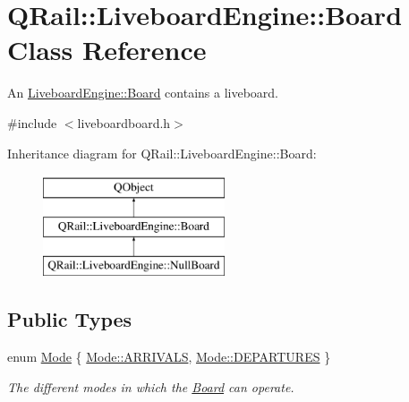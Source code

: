 \hypertarget{classQRail_1_1LiveboardEngine_1_1Board}{}\section{Q\+Rail\+::Liveboard\+Engine\+::Board Class Reference}
\label{classQRail_1_1LiveboardEngine_1_1Board}


An \mbox{\hyperlink{classQRail_1_1LiveboardEngine_1_1Board}{Liveboard\+Engine\+::\+Board}} contains a liveboard.  




{\ttfamily \#include $<$liveboardboard.\+h$>$}

Inheritance diagram for Q\+Rail\+::Liveboard\+Engine\+::Board\+:\begin{figure}[H]
\begin{center}
\leavevmode
\includegraphics[height=3.000000cm]{classQRail_1_1LiveboardEngine_1_1Board}
\end{center}
\end{figure}
\subsection*{Public Types}
\begin{DoxyCompactItemize}
\item 
enum \mbox{\hyperlink{classQRail_1_1LiveboardEngine_1_1Board_a0ab6d318f405895f62c6e98cb2d86c6e}{Mode}} \{ \mbox{\hyperlink{classQRail_1_1LiveboardEngine_1_1Board_a0ab6d318f405895f62c6e98cb2d86c6ea2906f1567c46a28f5a256a77e6aca76a}{Mode\+::\+A\+R\+R\+I\+V\+A\+LS}}, 
\mbox{\hyperlink{classQRail_1_1LiveboardEngine_1_1Board_a0ab6d318f405895f62c6e98cb2d86c6ea560e6dfa758a32c703224545b841a386}{Mode\+::\+D\+E\+P\+A\+R\+T\+U\+R\+ES}}
 \}
\begin{DoxyCompactList}\small\item\em The different modes in which the \mbox{\hyperlink{classQRail_1_1LiveboardEngine_1_1Board}{Board}} can operate. \end{DoxyCompactList}\end{DoxyCompactItemize}
